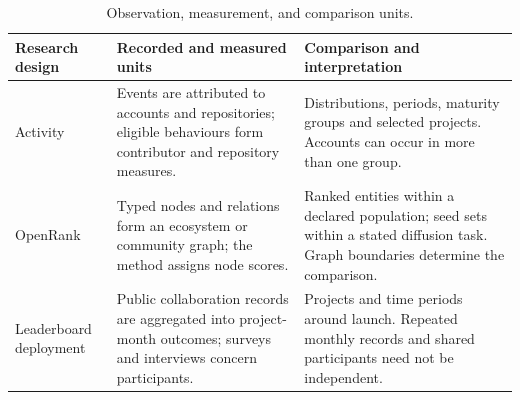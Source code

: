 \begin{table}[tbp]
\caption{Observation, measurement, and comparison units.}
\label{tab:ch3-units}
\begingroup\fontsize{9.2}{11.8}\selectfont
\renewcommand{\arraystretch}{1.12}
\begin{tabularx}{\textwidth}{@{}>{\raggedright\arraybackslash}p{23mm}>{\raggedright\arraybackslash}X >{\raggedright\arraybackslash}X@{}}
\toprule
\textbf{Research design} & \textbf{Recorded and measured units} & \textbf{Comparison and interpretation}\\
\midrule
Activity & Events are attributed to accounts and repositories; eligible behaviours form contributor and repository measures. & Distributions, periods, maturity groups and selected projects. Accounts can occur in more than one group.\\[5pt]
OpenRank & Typed nodes and relations form an ecosystem or community graph; the method assigns node scores. & Ranked entities within a declared population; seed sets within a stated diffusion task. Graph boundaries determine the comparison.\\[5pt]
Leaderboard deployment & Public collaboration records are aggregated into project-month outcomes; surveys and interviews concern participants. & Projects and time periods around launch. Repeated monthly records and shared participants need not be independent.\\
\bottomrule
\end{tabularx}
\endgroup
{}
\end{table}
